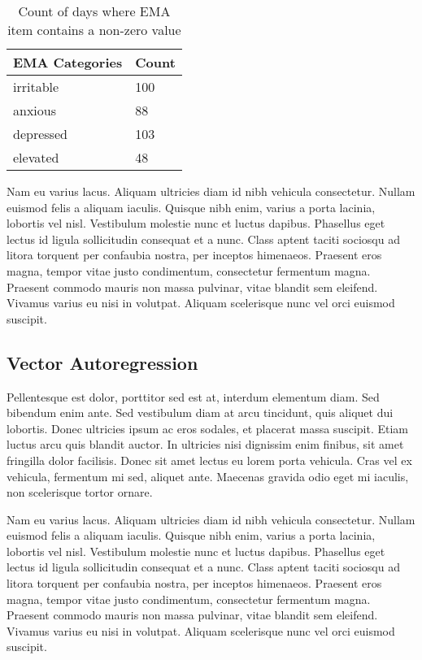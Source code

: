 \documentclass{article}
\begin{document}
\begin{table}[ht]
    \centering
    \begin{tabular}{ll}
    \toprule
        \textbf{EMA Categories} & \textbf{Count} \\ \midrule
        irritable & 100 \\
        anxious & 88  \\
        depressed & 103  \\
        elevated & 48  \\
        \bottomrule
    \end{tabular}
\caption{Count of days where EMA item contains a non-zero value}
\label{EMA}
\end{table}


Nam eu varius lacus. Aliquam ultricies diam id nibh vehicula
consectetur. Nullam euismod felis a aliquam iaculis. Quisque nibh enim,
varius a porta lacinia, lobortis vel nisl. Vestibulum molestie nunc et
luctus dapibus. Phasellus eget lectus id ligula sollicitudin consequat
et a nunc. Class aptent taciti sociosqu ad litora torquent per confaubia
nostra, per inceptos himenaeos. Praesent eros magna, tempor vitae justo
condimentum, consectetur fermentum magna. Praesent commodo mauris non
massa pulvinar, vitae blandit sem eleifend. Vivamus varius eu nisi in
volutpat. Aliquam scelerisque nunc vel orci euismod suscipit.

\hypertarget{vector-autoregression}{%
\subsection{Vector Autoregression}\label{vector-autoregression}}

\citep{seabold2010statsmodels}

\citep{lutkepohlNew2005}

Pellentesque est dolor, porttitor sed est at, interdum elementum diam.
Sed bibendum enim ante. Sed vestibulum diam at arcu tincidunt, quis
aliquet dui lobortis. Donec ultricies ipsum ac eros sodales, et placerat
massa suscipit. Etiam luctus arcu quis blandit auctor. In ultricies nisi
dignissim enim finibus, sit amet fringilla dolor facilisis. Donec sit
amet lectus eu lorem porta vehicula. Cras vel ex vehicula, fermentum mi
sed, aliquet ante. Maecenas gravida odio eget mi iaculis, non
scelerisque tortor ornare.

Nam eu varius lacus. Aliquam ultricies diam id nibh vehicula
consectetur. Nullam euismod felis a aliquam iaculis. Quisque nibh enim,
varius a porta lacinia, lobortis vel nisl. Vestibulum molestie nunc et
luctus dapibus. Phasellus eget lectus id ligula sollicitudin consequat
et a nunc. Class aptent taciti sociosqu ad litora torquent per confaubia
nostra, per inceptos himenaeos. Praesent eros magna, tempor vitae justo
condimentum, consectetur fermentum magna. Praesent commodo mauris non
massa pulvinar, vitae blandit sem eleifend. Vivamus varius eu nisi in
volutpat. Aliquam scelerisque nunc vel orci euismod suscipit.
\end{document}
